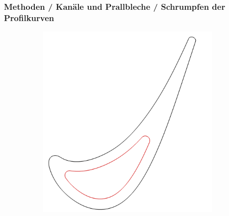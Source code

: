 \documentclass[8pt, aspectratio=169]{beamer}
\begin{document}
\begin{frame}
	\frametitle{Methoden / Kanäle und Prallbleche / Schrumpfen der Profilkurven}
	\vspace{-1cm}\hspace{-0.5cm}
	\begin{figure}
		\centering
		\begin{subfigure}[t]{.49\textwidth}
			\includegraphics[height=.8\textheight]{../tec/shrinking/13.png}
		\end{subfigure}
	\end{figure}
\end{frame}
\end{document}
